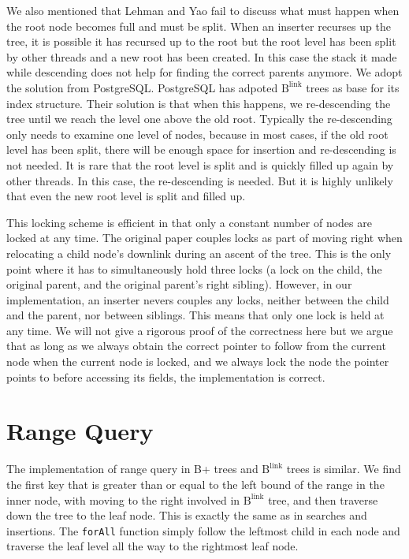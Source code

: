 \documentclass[twoside,11pt]{report}
\theoremstyle{definition}
\begin{document}
We also mentioned that Lehman and Yao fail to discuss what must happen when the root node becomes full and must be split. When an inserter recurses up the tree, it is possible it has recursed up to the root but the root level has been split by other threads and a new root has been created. In this case the stack it made while descending does not help for finding the correct parents anymore. We adopt the solution from PostgreSQL. PostgreSQL has adpoted $\text{B}^{\text{link}}$ trees as base for its index structure. Their solution is that when this happens, we re-descending the tree until we reach the level one above the old root. Typically the re-descending only needs to examine one level of nodes, because in most cases, if the old root level has been split, there will be enough space for insertion and re-descending is not needed. It is rare that the root level is split and is quickly filled up again by other threads. In this case, the re-descending is needed. But it is highly unlikely that even the new root level is split and filled up.

This locking scheme is efficient in that only a constant number of nodes are locked at any time. The original paper couples locks as part of moving right when relocating a child node's downlink during an ascent of the tree.  This is the only point where it has to simultaneously hold three locks (a lock on the child, the original parent, and the original parent's right sibling). However, in our implementation, an inserter nevers couples any locks, neither between the child and the parent, nor between siblings. This means that only one lock is held at any time. We will not give a rigorous proof of the correctness here but we argue that as long as we always obtain the correct pointer to follow from the current node when the current node is locked, and we always lock the node the pointer points to before accessing its fields, the implementation is correct.

\section{Range Query}
\label{sec:range-query}

The implementation of range query in B+ trees and $\text{B}^{\text{link}}$ trees is similar. We find the first key that is greater than or equal to the left bound of the range in the inner node, with moving to the right involved in $\text{B}^{\text{link}}$ tree, and then traverse down the tree to the leaf node. This is exactly the same as in searches and insertions. The \texttt{forAll} function simply follow the leftmost child in each node and traverse the leaf level all the way to the rightmost leaf node.
\end{document}
